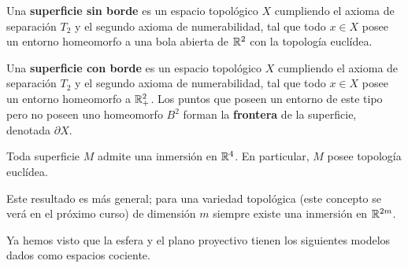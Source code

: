 \documentclass[GTS.tex]{subfiles}
\begin{document}
\begin{defi} Una \textbf{superficie sin borde} es un espacio topológico $X$ cumpliendo el axioma de separación $T_2$ y el segundo axioma de numerabilidad, tal que todo $x\in X$ posee un entorno homeomorfo a una bola abierta de $\mathbb{R}^2$ con la topología euclídea.
\end{defi}

\begin{defi} Una \textbf{superficie con borde} es un espacio topológico $X$ cumpliendo el axioma de separación $T_2$ y el segundo axioma de numerabilidad, tal que todo $x\in X$ posee un entorno homeomorfo a $\mathbb{R}^2_+$. Los puntos que poseen un entorno de este tipo pero no poseen uno homeomorfo $B^2$ forman la \textbf{frontera} de la superficie, denotada $\partial X$.
\end{defi}

\begin{teorema} Toda superficie $M$ admite una inmersión en $\mathbb{R}^4$. En particular, $M$ posee topología euclídea. 
\end{teorema}

\begin{nota} Este resultado es más general; para una variedad topológica (este concepto se verá en el próximo curso) de dimensión $m$ siempre existe una inmersión en $\mathbb{R}^{2m}$.
\end{nota}



Ya hemos visto que la esfera y el plano proyectivo tienen los siguientes modelos dados como espacios cociente.
\end{document}

